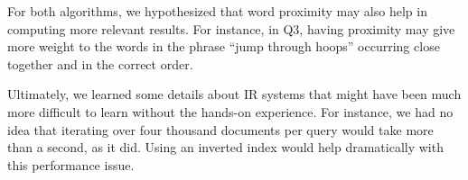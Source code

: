 \documentclass{report}
\begin{document}
For both algorithms, we hypothesized that word proximity may also help
in computing more relevant results. For instance, in Q3, having
proximity may give more weight to the words in the phrase ``jump
through hoops'' occurring close together and in the correct order.

Ultimately, we learned some details about IR systems that might have
been much more difficult to learn without the hands-on experience. For
instance, we had no idea that iterating over four thousand documents
per query would take more than a second, as it did. Using an inverted
index would help dramatically with this performance issue.
\end{document}
